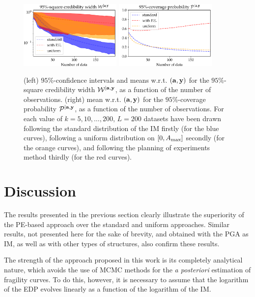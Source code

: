 \begin{figure}[h!]
    \centering%
    \includegraphics[width=5cm]{figures/low-doe/errW.pdf}%
    \includegraphics[width=5cm]{figures/low-doe/errP.pdf}%
    \caption{(left) $95\%$-confidence intervals and means w.r.t.{ }$(\mathbf{a},\mathbf{y})$ for the $95\%$-square credibility width $\mathcal{W}^{|\mathbf{a},\mathbf{y}}$, as a function of the number of observations. (right) mean w.r.t.{ }$(\mathbf{a},\mathbf{y})$ for the $95\%$-coverage probability $\mathcal{P}^{|\mathbf{a},\mathbf{y}}$, as a function of the number of observations. For each value of $k=5,10,\dots,200$, $L=200$ datasets have been drawn following the standard distribution of the IM firstly (for the blue curves), {following a uniform distribution on $[0,A_{\rm max}]$ secondly (for the orange curves)}, and following the planning of experiments method thirdly (for the red curves).} %
    \label{lowdoe:fig:credibility}
\end{figure}

\section{Discussion}\label{lowdoe:sec:discussion}

The results presented in the previous section clearly illustrate the superiority of the PE-based approach over the standard {and uniform} approaches. Similar results, not presented here for the sake of brevity, and obtained with the PGA as IM, as well as with other types of structures, also confirm these results.

The strength of the approach proposed in this work is its completely analytical nature, which avoids the use of MCMC methods for the \emph{a posteriori} estimation of fragility curves. To do this, however, it is necessary to assume that the logarithm of the EDP evolves linearly as a function of the logarithm of the IM.

